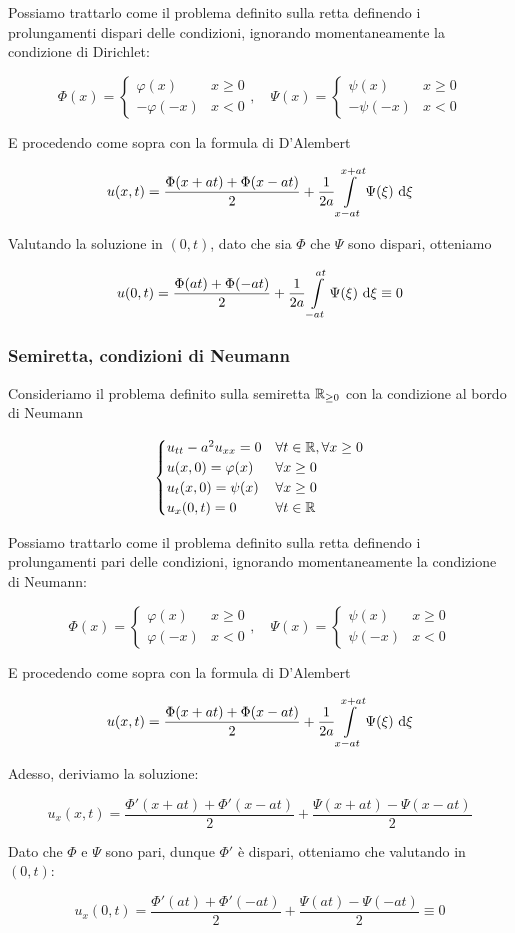 \documentclass{article}
\begin{document}
Possiamo trattarlo come il problema definito sulla retta definendo i prolungamenti dispari delle condizioni, ignorando momentaneamente la condizione di Dirichlet:

\[ \Phi(x) = \begin{cases} \varphi(x) & x\ge 0 \\ -\varphi(-x) & x<0\end{cases}, \quad \Psi(x) = \begin{cases}\psi(x) & x\ge 0 \\ -\psi(-x) & x<0\end{cases}\]

E procedendo come sopra con la formula di D'Alembert 

\[u(x,t) = \frac{\Phi(x+at) + \Phi(x-at) }{2} + \frac{1}{2a} \intop_{x-at}^{x+at} \Psi(\xi)\de \xi \]

Valutando la soluzione in $(0,t)$, dato che sia $\Phi$ che $\Psi$ sono dispari, otteniamo

\[ u(0,t) = \frac{\Phi(at) + \Phi(-at) }{2} + \frac{1}{2a} \intop_{-at}^{at} \Psi(\xi)\de \xi \equiv 0 \]

\subsubsection{Semiretta, condizioni di Neumann}

Consideriamo il problema definito sulla semiretta $\mathbb{R}_{\ge 0}$ con la condizione al bordo di Neumann

\[ \begin{cases}
    u_{tt} - a^2 u_{xx} = 0 & \forall t \in \mathbb{R}, \forall x \ge 0\\
    u(x,0) = \varphi(x) & \forall x \ge 0\\
    u_t(x,0) = \psi(x) & \forall x \ge 0\\
    u_x(0,t) = 0 & \forall t \in \mathbb{R}
\end{cases} \]

Possiamo trattarlo come il problema definito sulla retta definendo i prolungamenti pari delle condizioni, ignorando momentaneamente la condizione di Neumann:

\[ \Phi(x) = \begin{cases} \varphi(x) & x\ge 0 \\ \varphi(-x) & x<0\end{cases}, \quad \Psi(x) = \begin{cases}\psi(x) & x\ge 0 \\ \psi(-x) & x<0\end{cases}\]

E procedendo come sopra con la formula di D'Alembert

\[u(x,t) = \frac{\Phi(x+at) + \Phi(x-at) }{2} + \frac{1}{2a} \intop_{x-at}^{x+at} \Psi(\xi)\de \xi \]

Adesso, deriviamo la soluzione:

\[ u_x(x,t) = \frac{\Phi'(x+at) + \Phi'(x-at)}{2} + \frac{\Psi(x+at) - \Psi(x-at)}{2} \]

Dato che $\Phi$ e $\Psi$ sono pari, dunque $\Phi'$ è dispari, otteniamo che valutando in $(0,t)$:

\[ u_x(0,t) = \frac{\Phi'(at) + \Phi'(-at)}{2} + \frac{\Psi(at) - \Psi(-at)}{2} \equiv 0\]
\end{document}
